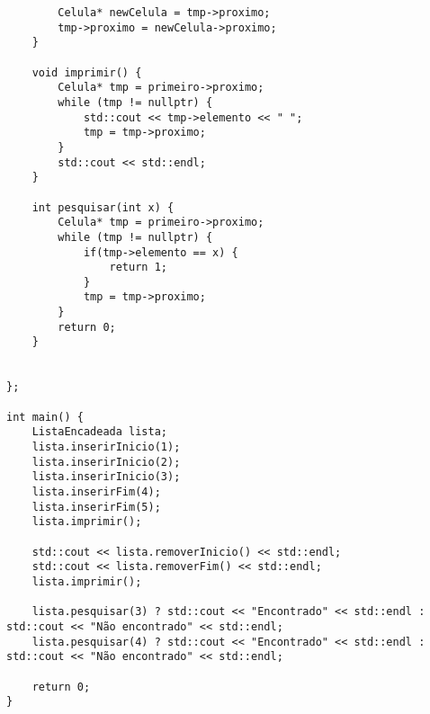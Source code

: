 \documentclass{article}
\begin{document}
\begin{lstlisting}
        Celula* newCelula = tmp->proximo;
        tmp->proximo = newCelula->proximo;
    }

    void imprimir() {
        Celula* tmp = primeiro->proximo;
        while (tmp != nullptr) {
            std::cout << tmp->elemento << " ";
            tmp = tmp->proximo;
        }
        std::cout << std::endl;
    }

    int pesquisar(int x) {
        Celula* tmp = primeiro->proximo;
        while (tmp != nullptr) {
            if(tmp->elemento == x) {
                return 1;
            }
            tmp = tmp->proximo;
        }
        return 0;
    }


};

int main() {
    ListaEncadeada lista;
    lista.inserirInicio(1);
    lista.inserirInicio(2);
    lista.inserirInicio(3);
    lista.inserirFim(4);
    lista.inserirFim(5);
    lista.imprimir();
    
    std::cout << lista.removerInicio() << std::endl;
    std::cout << lista.removerFim() << std::endl;
    lista.imprimir();

    lista.pesquisar(3) ? std::cout << "Encontrado" << std::endl : std::cout << "Não encontrado" << std::endl;
    lista.pesquisar(4) ? std::cout << "Encontrado" << std::endl : std::cout << "Não encontrado" << std::endl;

    return 0;
}
\end{lstlisting}
\end{document}
